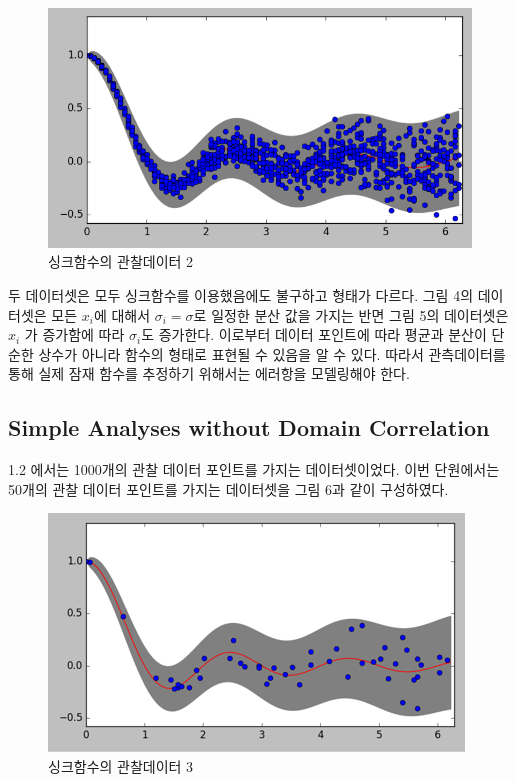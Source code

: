 \documentclass[a4paper]{oblivoir}
\begin{document}
\begin{figure}[ht] \centering 
\includegraphics[scale=0.6]{fig12_6.png} 
\caption{싱크함수의 관찰데이터 2}
\label{fig:12-5}
\end{figure} 

두 데이터셋은 모두 싱크함수를 이용했음에도 불구하고 형태가 다르다. 그림 4의  데이터셋은 모든 $x_{i}$에 대해서  $\sigma_{i} = \sigma$로 일정한 분산 값을 가지는 반면 그림 5의 데이터셋은 $x_{i}$ 가 증가함에 따라 $\sigma_{i}$도 증가한다. 
이로부터 데이터 포인트에 따라 평균과 분산이 단순한 상수가 아니라 함수의 형태로 표현될 수 있음을 알 수 있다. 따라서 관측데이터를 통해 실제 잠재 함수를 추정하기 위해서는 에러항을 모델링해야 한다.

\subsection{Simple Analyses without Domain Correlation}

1.2 에서는 1000개의 관찰 데이터 포인트를 가지는 데이터셋이었다. 이번 단원에서는 50개의 관찰 데이터 포인트를 가지는 데이터셋을 그림 6과 같이 구성하였다.
\begin{figure}[ht] \centering 
\includegraphics[scale=1]{fig12_7.png} 
\caption{싱크함수의 관찰데이터 3}
\label{fig:12-6}
\end{figure}
\end{document}
